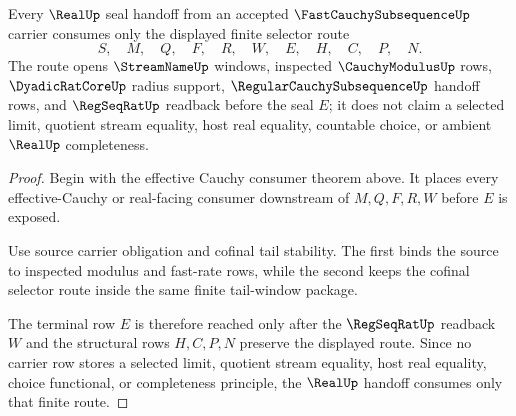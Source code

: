 \begin{theorem}
\label{thm:fast-cauchy-subsequence-real-seal-handoff}
Every $\RealUp$ seal handoff from an accepted $\FastCauchySubsequenceUp$ carrier consumes only the displayed finite selector route
$$
S,\quad M,\quad Q,\quad F,\quad R,\quad W,\quad E,\quad H,\quad C,\quad P,\quad N.
$$
The route opens $\StreamNameUp$ windows, inspected $\CauchyModulusUp$ rows, $\DyadicRatCoreUp$ radius support, $\RegularCauchySubsequenceUp$ handoff rows, and $\RegSeqRatUp$ readback before the seal $E$; it does not claim a selected limit, quotient stream equality, host real equality, countable choice, or ambient $\RealUp$ completeness.
\end{theorem}
\begin{proof}
Begin with the effective Cauchy consumer theorem above. It places every effective-Cauchy or real-facing consumer downstream of $M,Q,F,R,W$ before $E$ is exposed.

Use source carrier obligation and cofinal tail stability. The first binds the source to inspected modulus and fast-rate rows, while the second keeps the cofinal selector route inside the same finite tail-window package.

The terminal row $E$ is therefore reached only after the $\RegSeqRatUp$ readback $W$ and the structural rows $H,C,P,N$ preserve the displayed route. Since no carrier row stores a selected limit, quotient stream equality, host real equality, choice functional, or completeness principle, the $\RealUp$ handoff consumes only that finite route.
\end{proof}

